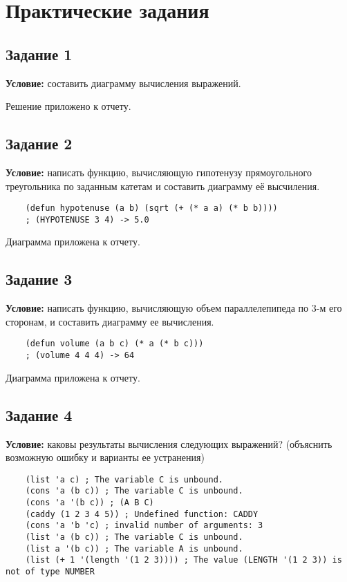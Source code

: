 \chapter{Практические задания}

\section{Задание 1}

\textbf{Условие:} составить диаграмму вычисления выражений.

Решение приложено к отчету.


\section{Задание 2}

\textbf{Условие:} написать функцию, вычисляющую гипотенузу прямоугольного треугольника по заданным катетам и составить диаграмму её высчиления.

\begin{lstlisting}
	(defun hypotenuse (a b) (sqrt (+ (* a a) (* b b))))
	; (HYPOTENUSE 3 4) -> 5.0
\end{lstlisting}

Диаграмма приложена к отчету.


\section{Задание 3}

\textbf{Условие:} написать функцию, вычисляющую объем параллелепипеда по 3-м его сторонам, и составить диаграмму ее вычисления.

\begin{lstlisting}
	(defun volume (a b c) (* a (* b c)))
	; (volume 4 4 4) -> 64
\end{lstlisting}

Диаграмма приложена к отчету.


\section{Задание 4}

\textbf{Условие:} каковы результаты вычисления следующих выражений? (объяснить возможную ошибку и варианты ее устранения)

\begin{lstlisting}
	(list 'a c) ; The variable C is unbound.
	(cons 'a (b c)) ; The variable C is unbound.
	(cons 'a '(b c)) ; (A B C)
	(caddy (1 2 3 4 5)) ; Undefined function: CADDY
	(cons 'a 'b 'c) ; invalid number of arguments: 3
	(list 'a (b c)) ; The variable C is unbound.
	(list a '(b c)) ; The variable A is unbound.
	(list (+ 1 '(length '(1 2 3)))) ; The value (LENGTH '(1 2 3)) is not of type NUMBER
\end{lstlisting}

